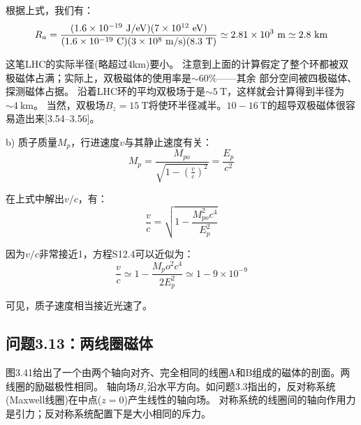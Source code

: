 根据上式，我们有：
\begin{equation*}
R_{a}=\frac{(1.6\times 10^{-19}\ \mathrm{J/eV})(7\times 10^{12}\ \mathrm{eV})}{(1.6\times 10^{-19}\ \mathrm{C})(3\times 10^{8}\ \mathrm{m/s})(8.3\ \mathrm{T})}\\
\simeq 2.81\times 10^{3}\ \mathrm{m}\simeq 2.8\ \mathrm{km}
\end{equation*}

这笔LHC的实际半径(略超过4km)要小。
注意到上面的计算假定了整个环都被双极磁体占满；实际上，双极磁体的使用率是$\sim 60\%$——其余
部分空间被四极磁体、探测磁体占据。
沿着LHC环的平均双极场于是$\sim 5\ \mathrm{T}$，这样就会计算得到半径为$\sim 4\ \mathrm{km}$。
当然，双极场$B_z=15\ \mathrm{T}$将使环半径减半。$10-16\ \mathrm{T}$的超导双极磁体很容易造出来[3.54–3.56]。

b) 质子质量$M_p$，行进速度$v$与其静止速度有关：
\begin{equation*}
M_{p}=\frac{M_{po}}{\sqrt{1-(\frac{v}{c})^{2}}}=\frac{E_{p}}{c^{2}}\tag{S12.3}%
\end{equation*}

在上式中解出$v/c$，有：
\begin{equation*}
\frac{v}{c}=\sqrt{1-\frac{M_{po}^{2}c^{4}}{E_{p}^{2}}}\tag{S12.4}
\end{equation*}

因为$v/c$非常接近1，方程S12.4可以近似为：
\begin{equation*}
\frac{v}{c}\simeq 1-\frac{M_po^2 c^4}{2E_p^2}\simeq 1-9\times 10^{-9}
\end{equation*}

可见，质子速度相当接近光速了。



\subsection{问题3.13：两线圈磁体}
图3.41给出了一个由两个轴向对齐、完全相同的线圈A和B组成的磁体的剖面。两线圈的励磁极性相同。
轴向场$B_z$沿水平方向。如问题3.3指出的，反对称系统(Maxwell线圈)在中点($z=0$)产生线性的轴向场。
对称系统的线圈间的轴向作用力是引力；反对称系统配置下是大小相同的斥力。

